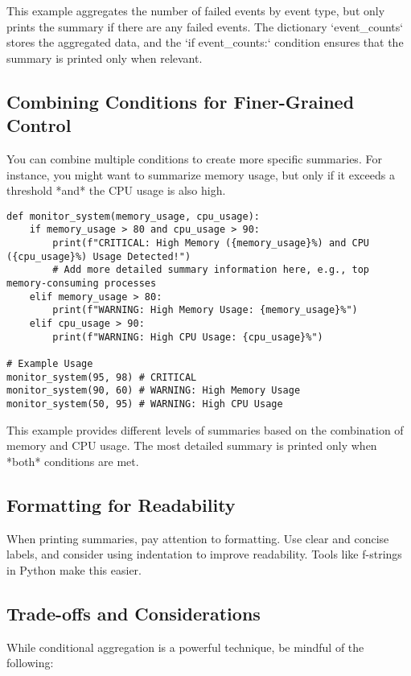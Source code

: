 \documentclass{article}
\begin{document}
{{{This example aggregates the number of failed events by event type, but only prints the summary if there are any failed events. The dictionary `event_counts` stores the aggregated data, and the `if event_counts:` condition ensures that the summary is printed only when relevant.

\subsection*{Combining Conditions for Finer-Grained Control}

You can combine multiple conditions to create more specific summaries. For instance, you might want to summarize memory usage, but only if it exceeds a threshold *and* the CPU usage is also high.

\begin{verbatim}
def monitor_system(memory_usage, cpu_usage):
    if memory_usage > 80 and cpu_usage > 90:
        print(f"CRITICAL: High Memory ({memory_usage}%) and CPU ({cpu_usage}%) Usage Detected!")
        # Add more detailed summary information here, e.g., top memory-consuming processes
    elif memory_usage > 80:
        print(f"WARNING: High Memory Usage: {memory_usage}%")
    elif cpu_usage > 90:
        print(f"WARNING: High CPU Usage: {cpu_usage}%")

# Example Usage
monitor_system(95, 98) # CRITICAL
monitor_system(90, 60) # WARNING: High Memory Usage
monitor_system(50, 95) # WARNING: High CPU Usage
\end{verbatim}

This example provides different levels of summaries based on the combination of memory and CPU usage. The most detailed summary is printed only when *both* conditions are met.

\subsection*{Formatting for Readability}

When printing summaries, pay attention to formatting. Use clear and concise labels, and consider using indentation to improve readability.  Tools like f-strings in Python make this easier.

\subsection*{Trade-offs and Considerations}

While conditional aggregation is a powerful technique, be mindful of the following:

}}}
\end{document}
